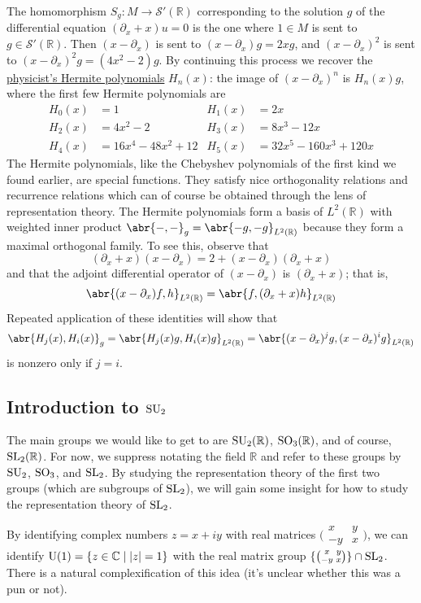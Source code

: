 \documentclass[../../rtnotes.tex]{subfiles}
\begin{document}
The homomorphism $S_g\colon M\to \mathcal S'(\mathbb R)$ corresponding to the solution $g$ of the differential equation $(\partial_x+x)u = 0$ is the one where $1\in M$ is sent to $g\in \mathcal S'(\mathbb R)$. Then $(x-\partial_x)$ is sent to $(x-\partial_x)g = 2xg$, and $(x-\partial_x)^2$ is sent to $(x-\partial_x)^2g = (4x^2-2)g$. By continuing this process we recover the \href{https://en.wikipedia.org/wiki/Hermite_polynomials}{physicist's Hermite polynomials} $H_n(x)$: the image of $(x-\partial_x)^n$ is $H_n(x)g$, where the first few Hermite polynomials are
\begin{align*}
	H_0(x) &= 1 & H_1(x) &= 2x\\
	H_2(x) &= 4x^2-2& H_3(x) &=8x^3-12x \\
	H_4(x) &= 16x^4-48x^2+12& H_5(x) &= 32x^5-160x^3+120x
\end{align*}
The Hermite polynomials, like the Chebyshev polynomials of the first kind we found earlier, are special functions. They satisfy nice orthogonality relations and recurrence relations which can of course be obtained through the lens of representation theory. The Hermite polynomials form a basis of $L^2(\mathbb R)$ with weighted inner product $\abr{-,-}_g = \abr{-g,-g}_{L^2(\mathbb R)}$ because they form a maximal orthogonal family. To see this, observe that 
\[(\partial_x+x)(x-\partial_x) = 2 + (x-\partial_x)(\partial_x+x)\]
and that the adjoint differential operator of $(x-\partial_x)$ is $(\partial_x + x)$; that is,
\[\abr{(x-\partial_x)f,h}_{L^2(\mathbb R)} = \abr{f,(\partial_x+x)h}_{L^2(\mathbb R)}\]
Repeated application of these identities will show that
\[\abr{H_j(x),H_i(x)}_g = \abr{H_j(x)g,H_i(x)g}_{L^2(\mathbb R)} = \abr{(x-\partial_x)^jg,(x-\partial_x)^ig}_{L^2(\mathbb R)}\]
is nonzero only if $j = i$.

\subsection{Introduction to $\operatorname{SU}_2$}
The main groups we would like to get to are $\operatorname{SU}_2(\mathbb R)$, $\operatorname{SO}_3(\mathbb R)$, and of course, $\operatorname{SL}_2(\mathbb R)$. For now, we suppress notating the field $\mathbb R$ and refer to these groups by $\operatorname{SU}_2$, $\operatorname{SO}_3$, and $\operatorname{SL}_2$. By studying the representation theory of the first two groups (which are subgroups of $\operatorname{SL}_2$), we will gain some insight for how to study the representation theory of $\operatorname{SL}_2$.

By identifying complex numbers $z = x+iy$ with real matrices $\bigl(\!\begin{smallmatrix}
	x & y \\ -y & x
\end{smallmatrix}\!\bigr)$, we can identify $\operatorname{U}(1) = \{z\in\mathbb C\mid \abs{z} = 1\}$ with the real matrix group $\{\bigl(\!\begin{smallmatrix}
	x & y \\ -y & x
\end{smallmatrix}\!\bigr)\}\cap\operatorname{SL}_2$. There is a natural complexification of this idea (it's unclear whether this was a pun or not).
\end{document}
